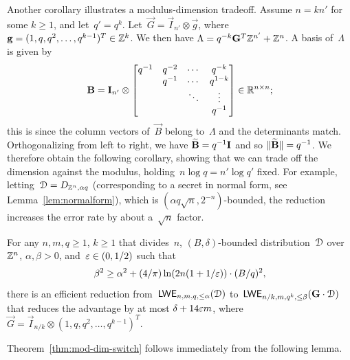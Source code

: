   Another corollary illustrates a modulus-dimension tradeoff.  Assume
  $n=kn'$ for some $k \ge 1$, and let~$q' = q^{k}$.  Let~$\vec{G} =
  \vec{I}_{n'} \otimes \vec{g}$, where~$\mathbf{g} = (1,q,q^2, \ldots,
  q^{k-1})^T \in \mathbb{Z}^k$.  We then have $\Lambda = q^{-k} \mathbf{G}^T
  \mathbb{Z}^{n'} + \mathbb{Z}^n$.  A basis of~$\Lambda$ is given by
\[
\mathbf{B}= \mathbf{I}_{n'} \otimes 
\begin{bmatrix}
q^{-1} & q^{-2} & \cdots & q^{-k} \\
       & q^{-1} & \cdots & q^{1-k} \\
       &        & \ddots & \vdots \\
       &		&		 & q^{-1}
     \end{bmatrix} \in \mathbb{R}^{n \times n};
\]
this is since the column vectors of~$\vec{B}$ belong to~$\Lambda$ and
the determinants match.  Orthogonalizing from left to right, we have
$\widetilde{\mathbf{B}} = q^{-1} \mathbf{I}$ and so $\lVert\widetilde{\mathbf{B}}\rVert=q^{-1}$.  We
therefore obtain the following corollary, showing that we can trade
off the dimension against the modulus, holding~$n \log q = n' \log q'$
fixed.  For example, letting~$\mathcal{D} = D_{\mathbb{Z}^{n}, \alpha q}$
(corresponding to a secret in normal form, see Lemma~\ref{lem:normalform}), which is $(\alpha q
\sqrt{n}, 2^{-n})$-bounded, 
the reduction increases the error rate by about
a~$\sqrt{n}$ factor. 

\begin{corollary}
  \label{cor:mod-dim-tradeoff}
  For any $n, m,q \ge 1$, $k \ge 1$ that divides~$n$,  $(B,\delta)$-bounded distribution~$\mathcal{D}$ over~$\mathbb{Z}^{n}$, 
	$\alpha,\beta>0$, and~$\varepsilon \in (0,1/2)$ such 
that
\[
\beta^{2} \geq \alpha^{2} + (4/\pi)
  \ln(2n(1+1/\varepsilon)) \cdot (B/q)^{2},
\]
  there is an efficient reduction from~$\mathsf{LWE}_{n,m,q,\le \alpha}(\mathcal{D})$
  to~$\mathsf{LWE}_{n/k,m,q^k,\le \beta}(\mathbf{G} \cdot \mathcal{D})$ that reduces the advantage by at most $\delta+14 \varepsilon m$, 
where~$\vec{G} = \vec{I}_{n/k} \otimes  (1,q,q^2, \ldots, q^{k-1})^T$.
\end{corollary}

\noindent Theorem~\ref{thm:mod-dim-switch} follows immediately from
the following lemma.


